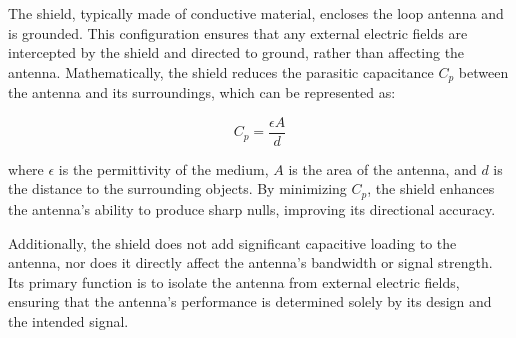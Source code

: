 The shield, typically made of conductive material, encloses the loop antenna and is grounded. This configuration ensures that any external electric fields are intercepted by the shield and directed to ground, rather than affecting the antenna. Mathematically, the shield reduces the parasitic capacitance \( C_p \) between the antenna and its surroundings, which can be represented as:

\[
C_p = \frac{\epsilon A}{d}
\]

where \( \epsilon \) is the permittivity of the medium, \( A \) is the area of the antenna, and \( d \) is the distance to the surrounding objects. By minimizing \( C_p \), the shield enhances the antenna’s ability to produce sharp nulls, improving its directional accuracy.

Additionally, the shield does not add significant capacitive loading to the antenna, nor does it directly affect the antenna’s bandwidth or signal strength. Its primary function is to isolate the antenna from external electric fields, ensuring that the antenna’s performance is determined solely by its design and the intended signal.

